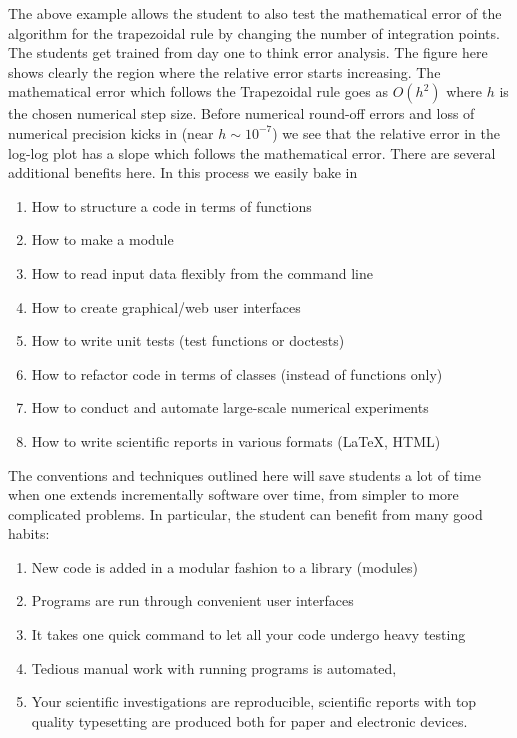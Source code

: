 \documentclass[graybox,envcountchap,sectrefs]{svmult}
\begin{document}
The above example allows the student to also test the mathematical error of the algorithm for the trapezoidal rule by changing the number of integration points. The students get trained from day one to think error analysis. The figure here shows clearly the region where the relative error starts increasing. 
The mathematical error which follows the Trapezoidal rule goes as $O(h^2)$ where $h$ is the chosen numerical step size. Before numerical round-off errors and loss of numerical precision kicks in (near $h\sim 10^{-7}$) we see that the relative error in the log-log plot has a slope which follows the mathematical error. 
There are several additional benefits here. In this process we easily bake in
\begin{enumerate}
  \item How to structure a code in terms of functions

  \item How to make a module

  \item How to read input data flexibly from the command line

  \item How to create graphical/web user interfaces

  \item How to write unit tests (test functions or doctests)

  \item How to refactor code in terms of classes (instead of functions only)

  \item How to conduct and automate large-scale numerical experiments

  \item How to write scientific reports in various formats ({\LaTeX}, HTML)
\end{enumerate}

\noindent
The conventions and techniques outlined here will save students a lot of time when one extends incrementally software over time, from simpler to more complicated problems. In particular, the student can  benefit from many good habits:
\begin{enumerate}
\item New code is added in a modular fashion to a library (modules)

\item Programs are run through convenient user interfaces

\item It takes one quick command to let all your code undergo heavy testing 

\item Tedious manual work with running programs is automated,

\item Your scientific investigations are reproducible, scientific reports with top quality typesetting are produced both for paper and electronic devices.
\end{enumerate}
\end{document}
